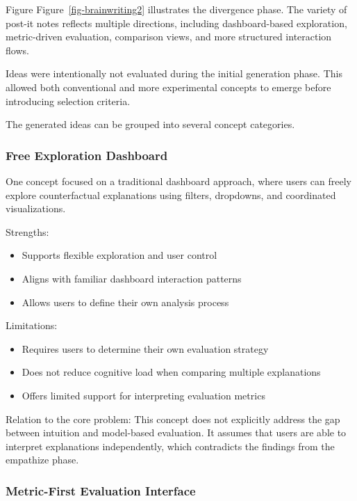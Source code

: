 \documentclass[
  letterpaper,
  DIV=11,
  numbers=noendperiod]{scrartcl}
\providecommand{\tightlist}{%
  \setlength{\itemsep}{0pt}\setlength{\parskip}{0pt}}\usepackage{longtable,booktabs,array}
\begin{document}
Figure Figure~\ref{fig-brainwriting2} illustrates the divergence phase.
The variety of post-it notes reflects multiple directions, including
dashboard-based exploration, metric-driven evaluation, comparison views,
and more structured interaction flows.

Ideas were intentionally not evaluated during the initial generation
phase. This allowed both conventional and more experimental concepts to
emerge before introducing selection criteria.

The generated ideas can be grouped into several concept categories.

\subsubsection{Free Exploration
Dashboard}\label{free-exploration-dashboard}

One concept focused on a traditional dashboard approach, where users can
freely explore counterfactual explanations using filters, dropdowns, and
coordinated visualizations.

Strengths:

\begin{itemize}
\tightlist
\item
  Supports flexible exploration and user control
\item
  Aligns with familiar dashboard interaction patterns
\item
  Allows users to define their own analysis process
\end{itemize}

Limitations:

\begin{itemize}
\tightlist
\item
  Requires users to determine their own evaluation strategy
\item
  Does not reduce cognitive load when comparing multiple explanations
\item
  Offers limited support for interpreting evaluation metrics
\end{itemize}

Relation to the core problem: This concept does not explicitly address
the gap between intuition and model-based evaluation. It assumes that
users are able to interpret explanations independently, which
contradicts the findings from the empathize phase.

\subsubsection{Metric-First Evaluation
Interface}\label{metric-first-evaluation-interface}
\end{document}
